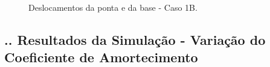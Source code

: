 \documentclass[aspectratio=169]{beamer}
\begin{document}
\begin{frame}
  \frametitle{\insertsubsection}
  \begin{figure}[H]
    \centering
    \caption{Deslocamentos da ponta e da base - Caso 1B.}
    \hfill
  \end{figure}
\end{frame}


\subsection{\insertsectionnumber .\insertsubsectionnumber . Resultados da Simulação - Variação do Coeficiente de Amortecimento}
\end{document}
